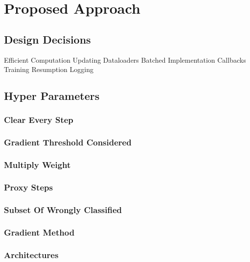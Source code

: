 
\chapter{Proposed Approach}
\section{Design Decisions}

Efficient Computation
Updating Dataloaders
Batched Implementation
Callbacks
Training Resumption
Logging

\section{Hyper Parameters}
\subsection{Clear Every Step}


\subsection{Gradient Threshold Considered}

\subsection{Multiply Weight}

\subsection{Proxy Steps}

\subsection{Subset Of Wrongly Classified}


\subsection{Gradient Method}
\subsection{Architectures}
